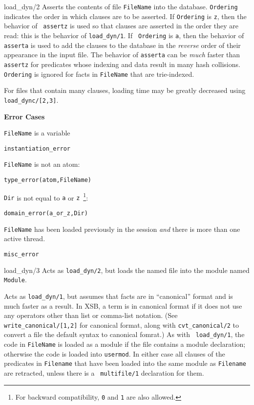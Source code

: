 \begin{description}
             {load\_dyn/2}\label{load_dyn/2}
%
    Asserts the contents of file {\tt FileName} into the database.
    {\tt Ordering} indicates the order in which clauses are to be
    asserted.  If {\tt Ordering} is {\tt z}, then the behavior of {\tt
      assertz} is used so that clauses are asserted in the order they
    are read: this is the behavior of {\tt load\_dyn/1}.  If {\tt
      Ordering} is {\tt a}, then the behavior of {\tt asserta} is used
    to add the clauses to the database in the {\em reverse} order of
    their appearance in the input file.  The behavior of {\tt asserta}
    can be {\em much} faster than {\tt assertz} for predicates whose
    indexing and data result in many hash collisions.  {\tt Ordering}
    is ignored for facts in {\tt FileName} that are trie-indexed.

    For files that contain many clauses, loading time may be greatly
    decreased using {\tt load\_dync/[2,3]}.

    {\bf Error Cases}
\bi
\item 	{\tt FileName} is a variable
\bi
\item 	{\tt instantiation\_error}
\ei
\item 	{\tt FileName} is not an atom:
\bi
\item 	{\tt type\_error(atom,FileName)}
\ei
%
\item 	{\tt Dir} is not equal to {\tt a} or {\tt z}~\footnote{For
backward compatibility, {\tt 0} and {\tt 1} are also allowed.}: 
\bi
\item 	{\tt domain\_error(a\_or\_z,Dir)}
\ei
%
\item {\tt FileName} has been loaded previously in the session {\em and}
  there is more than one active thread.  
\bi
\item 	{\tt misc\_error}
\ei
\ei

{load\_dyn/3}\label{load_dyn/3}
Acts as {\tt load\_dyn/2}, but loads the named file into the module named
{\tt Module}.

 
%
  Acts as {\tt load\_dyn/1}, but assumes that facts are in
  ``canonical'' format and is much faster as a result.  In XSB, a term
  is in canonical format if it does not use any operators other than
  list or comma-list notation.  (See {\tt write\_canonical/[1,2]} for
    canonical format, along with {\tt cvt\_canonical/2} to convert a
    file the default syntax to canonical fomrat.)  As with {\tt
      load\_dyn/1}, the code in {\tt FileName} is loaded as a module
    if the file contains a module declaration; otherwise the code is
    loaded into {\tt usermod}.  In either case all clauses of the
    predicates in {\tt Filename} that have been loaded into the same
    module as {\tt Filename} are retracted, unless there is a {\tt
      multifile/1} declaration for them.
    

\end{description}
